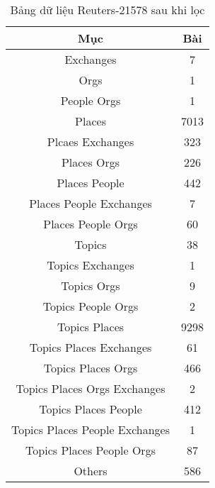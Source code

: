 \begin{table}[ht]
\begin{center}
\begin{tabular}{|c|c|}
\hline
Mục & Bài \\
\hline
Exchanges & 7\\
\hline
Orgs & 1\\
\hline
People Orgs & 1\\
\hline
Places & 7013\\
\hline
Plcaes Exchanges & 323\\
\hline
Places Orgs & 226\\
\hline
Places People & 442\\
\hline
Places People Exchanges & 7\\
\hline
Places People Orgs & 60\\
\hline
Topics & 38\\
\hline
Topics Exchanges & 1\\
\hline
Topics Orgs & 9\\
\hline
Topics People Orgs & 2\\
\hline
Topics Places & 9298\\
\hline
Topics Places Exchanges & 61\\
\hline
Topics Places Orgs & 466\\
\hline
Topics Places Orgs Exchanges & 2\\
\hline
Topics Places People & 412\\
\hline
Topics Places People Exchanges & 1\\
\hline
Topics Places People Orgs & 87\\
\hline
Others & 586\\
\hline
\end{tabular}
\caption[Bảng dữ liệu Reuters]{Bảng dữ liệu Reuters-21578 sau khi lọc}
\label{bang_4_1}
\end{center}
\end{table}
\noindent

